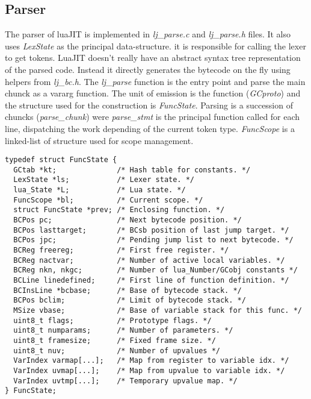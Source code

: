 
\subsection{Parser}
\label{Subsec:Parser}

The parser of luaJIT is implemented in \emph{lj\_parse.c} and \emph{lj\_parse.h}
files. It also uses \emph{LexState} as the principal data-structure. it is
responsible for calling the lexer to get tokens. LuaJIT doesn't really have an
abstract syntax tree representation of the parsed code. Instead it directly
generates the bytecode on the fly using helpers from \emph{lj\_bc.h}.
The \emph{lj\_parse} function is the entry point and parse the main chunck as a
vararg function. The unit of emission is the function (\emph{GCproto}) and the structure used for the construction is \emph{FuncState}. Parsing is a succession
of chuncks (\emph{parse\_chunk}) were \emph{parse\_stmt} is the principal
function called for each line, dispatching the work depending of the current
token type. \emph{FuncScope} is a linked-list of structure used for scope
management.

\begin{lstlisting}[style=CStyle]
typedef struct FuncState {
  GCtab *kt;              /* Hash table for constants. */
  LexState *ls;           /* Lexer state. */
  lua_State *L;           /* Lua state. */
  FuncScope *bl;          /* Current scope. */
  struct FuncState *prev; /* Enclosing function. */
  BCPos pc;               /* Next bytecode position. */
  BCPos lasttarget;       /* BCsb position of last jump target. */
  BCPos jpc;              /* Pending jump list to next bytecode. */
  BCReg freereg;          /* First free register. */
  BCReg nactvar;          /* Number of active local variables. */
  BCReg nkn, nkgc;        /* Number of lua_Number/GCobj constants */
  BCLine linedefined;     /* First line of function definition. */
  BCInsLine *bcbase;      /* Base of bytecode stack. */
  BCPos bclim;            /* Limit of bytecode stack. */
  MSize vbase;            /* Base of variable stack for this func. */
  uint8_t flags;          /* Prototype flags. */
  uint8_t numparams;      /* Number of parameters. */
  uint8_t framesize;      /* Fixed frame size. */
  uint8_t nuv;            /* Number of upvalues */
  VarIndex varmap[...];   /* Map from register to variable idx. */
  VarIndex uvmap[...];    /* Map from upvalue to variable idx. */
  VarIndex uvtmp[...];    /* Temporary upvalue map. */
} FuncState;
\end{lstlisting}


